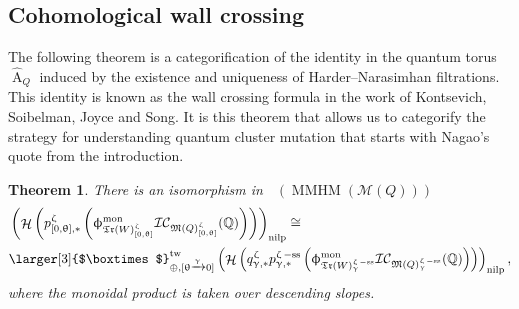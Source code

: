 \documentclass[a4paper,10pt]{amsart}
\newtheorem{theorem}{Theorem}[section]
\newcommand{\Boxtimes}{\mbox{\larger[3]{$\boxtimes$}}}
\newcommand{\WWW}{\mathfrak{Tr}(W)}
\newcommand{\Mst}{\mathfrak{M}}
\newcommand{\Msp}{\mathcal{M}}
\newcommand{\ICS}{\mathcal{IC}}
\newcommand{\phim}[1]{\phi^{\mon}_{#1}}
\renewcommand{\theta}{\uptheta}
\renewcommand{\gamma}{\upgamma}
\renewcommand{\zeta}{\upzeta}
\renewcommand{\phi}{\upphi}
\DeclareMathOperator{\sst}{-ss}
\DeclareMathOperator{\nilp}{nilp}
\DeclareMathOperator{\tw}{tw}
\DeclareMathOperator{\Ror}{A}
\DeclareMathOperator{\mon}{mon}
\DeclareMathOperator{\MMHM}{MMHM}
\DeclareMathOperator{\Ho}{\mathcal{H}}
\DeclareMathOperator{\Dulf}{\mathcal{D}^{\geq, lf}}
\begin{document}
\subsection{Cohomological wall crossing}
The following theorem is a categorification of the identity in the quantum torus $\hat{\Ror}_Q$ induced by the existence and uniqueness of Harder--Narasimhan filtrations.  This identity is known as the wall crossing formula in the work of Kontsevich, Soibelman, Joyce and Song.  It is this theorem that allows us to categorify the strategy for understanding quantum cluster mutation that starts with Nagao's quote from the introduction.
\begin{theorem}
\label{rays}
There is an isomorphism in $\Dulf(\MMHM(\Msp(Q)))$
\begin{align*}
&\left(\Ho\left(p_{[0,\theta],*}^{\zeta}\left(\phim{\WWW^{\zeta}_{[0,\theta]}}\ICS_{\Mst(Q)_{[0,\theta]}^{\zeta}}(\mathbb{Q})\right)\right)\right)_{\nilp}\cong\\&\Boxtimes_{\oplus,[\theta\xrightarrow{\gamma}0]}^{\tw}\left(\Ho\left(q^{\zeta}_{\gamma,*}p^{\zeta\sst}_{\gamma,*}\left(\phim{\WWW^{\zeta\sst}_{\gamma}}\ICS_{\Mst(Q)^{\zeta\sst}_{\gamma}}(\mathbb{Q})\right)\right)\right)_{\nilp},
\end{align*}
where the monoidal product is taken over descending slopes.
\end{theorem}
\end{document}
